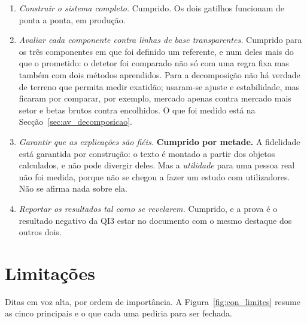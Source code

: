 \begin{enumerate}
  \item \emph{Construir o sistema completo.} Cumprido. Os dois gatilhos funcionam de ponta a ponta,
        em produção.
  \item \emph{Avaliar cada componente contra linhas de base transparentes.} Cumprido para os três
        componentes em que foi definido um referente, e num deles mais do que o prometido: o detetor
        foi comparado não só com uma regra fixa mas também com dois métodos aprendidos. Para a
        decomposição não há verdade de terreno que permita medir exatidão; usaram-se ajuste e
        estabilidade, mas ficaram por comparar, por exemplo, mercado apenas contra mercado mais
        setor e betas brutos contra encolhidos. O que foi medido está na
        Secção~\ref{sec:av_decomposicao}.
  \item \emph{Garantir que as explicações são fiéis.} \textbf{Cumprido por metade.} A fidelidade
        está garantida por construção: o texto é montado a partir dos objetos calculados, e não
        pode divergir deles. Mas a \emph{utilidade} para uma pessoa real não foi medida, porque não
        se chegou a fazer um estudo com utilizadores. Não se afirma nada sobre ela.
  \item \emph{Reportar os resultados tal como se revelarem.} Cumprido, e a prova é o resultado
        negativo da QI3 estar no documento com o mesmo destaque dos outros dois.
\end{enumerate}

\section{Limitações}
\label{sec:con_limitacoes}

Ditas em voz alta, por ordem de importância. A Figura~\ref{fig:con_limites} resume as cinco
principais e o que cada uma pediria para ser fechada.

